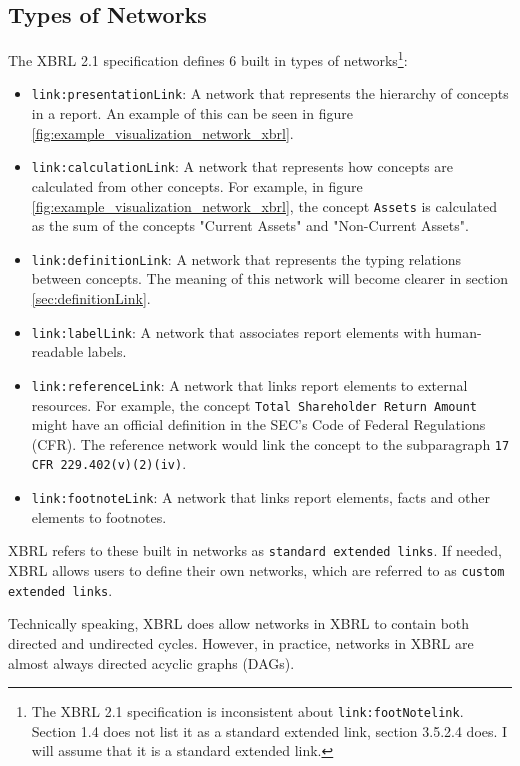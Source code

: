 \subsection{Types of Networks}

The XBRL 2.1 specification defines 6 built in types of networks\cite{xbrl21_terminology}\footnote[1]{The XBRL 2.1 specification is inconsistent about \texttt{link:footNotelink}. Section 1.4 does not list it as a standard extended link, section 3.5.2.4 does. I will assume that it is a standard extended link.}:

\begin{itemize}
    \item \texttt{link:presentationLink}: A network that represents the hierarchy of concepts in a report. An example of this can be seen in figure \ref{fig:example_visualization_network_xbrl}.
    \item \texttt{link:calculationLink}: A network that represents how concepts are calculated from other concepts. 
    For example, in figure \ref{fig:example_visualization_network_xbrl}, the concept \texttt{Assets} is calculated as the sum of the concepts "Current Assets" and "Non-Current Assets".
    \item \texttt{link:definitionLink}: A network that represents the typing relations between concepts.
    The meaning of this network will become clearer in section \ref{sec:definitionLink}.
    \item \texttt{link:labelLink}: A network that associates report elements with human-readable labels.
    \item \texttt{link:referenceLink}: A network that links report elements to external resources. 
    For example, the concept \texttt{Total Shareholder Return Amount} might have an official definition in the SEC's Code of Federal Regulations (CFR).
    The reference network would link the concept to the subparagraph \texttt{17 CFR 229.402(v)(2)(iv)}\cite{cfr_total_shareholder_return_amount}.
    \item \texttt{link:footnoteLink}: A network that links report elements, facts and other elements to footnotes.
\end{itemize}

XBRL refers to these built in networks as \texttt{standard extended links}. 
If needed, XBRL allows users to define their own networks, which are referred to as \texttt{custom extended links}\cite{xbrl21_terminology}.

Technically speaking, XBRL does allow networks in XBRL to contain both directed and undirected cycles.
However, in practice, networks in XBRL are almost always directed acyclic graphs (DAGs).

